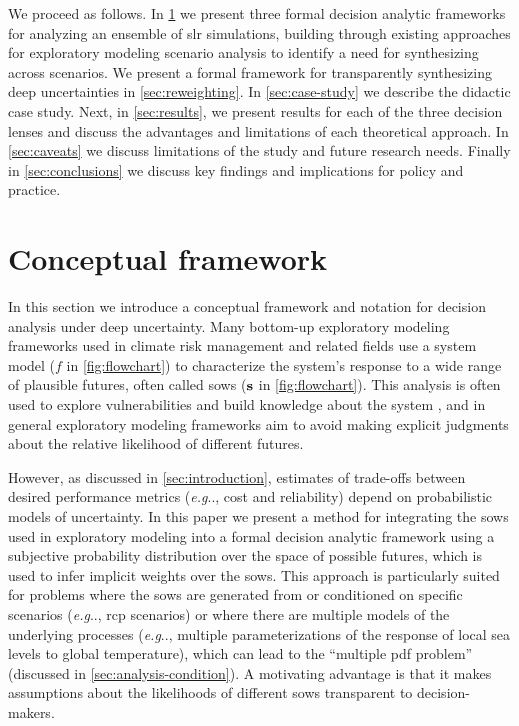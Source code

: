 \documentclass{agujournal2019}
\makeatletter
\DeclareRobustCommand\onedot{\futurelet\@let@token\@onedot}
\def\@onedot{\ifx\@let@token.\else.\null\fi\xspace}
\def\eg{\emph{e.g}\onedot} \def\Eg{\emph{E.g}\onedot}
\makeatother
\begin{document}
We proceed as follows.
In \cref{sec:analysis} we present three formal decision analytic frameworks for analyzing an ensemble of \gls{slr} simulations, building through existing approaches for exploratory modeling scenario analysis to identify a need for synthesizing across scenarios.
We present a formal framework for transparently synthesizing deep uncertainties in \cref{sec:reweighting}.
In \cref{sec:case-study} we describe the didactic case study.
Next, in \cref{sec:results}, we present results for each of the three decision lenses and discuss the advantages and limitations of each theoretical approach.
In \cref{sec:caveats} we discuss limitations of the study and future research needs.
Finally in \cref{sec:conclusions} we discuss key findings and implications for policy and practice.

\section{Conceptual framework}\label{sec:analysis}

In this section we introduce a conceptual framework and notation for decision analysis under deep uncertainty.
Many bottom-up exploratory modeling frameworks used in climate risk management and related fields use a system model ($f$ in \cref{fig:flowchart})  to characterize the system's response to a wide range of plausible futures, often called \glspl{sow} ($\vb{s}$ in \cref{fig:flowchart}).
This analysis is often used to explore vulnerabilities and build knowledge about the system \cite{bankes:1993}, and in general exploratory modeling frameworks aim to avoid making explicit judgments about the relative likelihood of different futures.

However, as discussed in \cref{sec:introduction}, estimates of trade-offs between desired performance metrics (\eg, cost and reliability) depend on probabilistic models of uncertainty.
In this paper we present a method for integrating the \glspl{sow} used in exploratory modeling into a formal decision analytic framework using a subjective probability distribution over the space of possible futures, which is used to infer implicit weights over the \glspl{sow}.
This approach is particularly suited for problems where the \glspl{sow} are generated from or conditioned on specific scenarios (\eg, \gls{rcp} scenarios) or where there are multiple models of the underlying processes (\eg, multiple parameterizations of the response of local sea levels to global temperature), which can lead to the ``multiple \gls{pdf} problem'' (discussed in \cref{sec:analysis-condition}).
A motivating advantage is that it makes assumptions about the likelihoods of different \glspl{sow} transparent to decision-makers.
\end{document}

